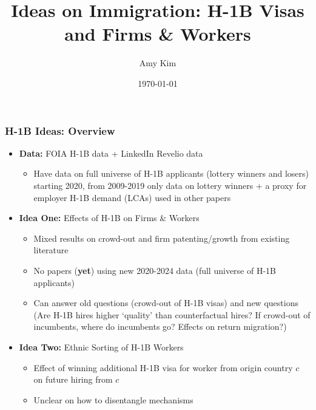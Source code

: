 \documentclass[xcolor=dvipsnames, compress, 12pt, aspectratio=169, handout]{beamer}
\title{Ideas on Immigration: H-1B Visas and Firms \& Workers}
\author{Amy Kim}
\date{\today}
\begin{document}
\begin{frame}[plain]
    \titlepage
\end{frame}

\begin{frame}
    \frametitle{H-1B Ideas: Overview}
    \begin{itemize}
        \item \textbf{Data:} FOIA H-1B data + LinkedIn Revelio data 
        \begin{itemize}
            \item Have data on full universe of H-1B applicants (lottery winners and losers) starting 2020, from 2009-2019 only data on lottery winners + a proxy for employer H-1B demand (LCAs) used in other papers 
        \end{itemize}
        \item \textbf{Idea One:} Effects of H-1B on Firms \& Workers
        \begin{itemize}
            \item Mixed results on crowd-out and firm patenting/growth from existing literature 
            \item No papers (\textbf{yet}) using new 2020-2024 data (full universe of H-1B applicants)
            \item Can answer old questions (crowd-out of H-1B visas) and new questions (Are H-1B hires higher `quality' than counterfactual hires? If crowd-out of incumbents, where do incumbents go? Effects on return migration?)
        \end{itemize}
        \item \textbf{Idea Two:} Ethnic Sorting of H-1B Workers 
        \begin{itemize}
            \item Effect of winning additional H-1B visa for worker from origin country $c$ on future hiring from $c$
            \item Unclear on how to disentangle mechanisms
        \end{itemize}
    \end{itemize}
\end{frame}
\end{document}
